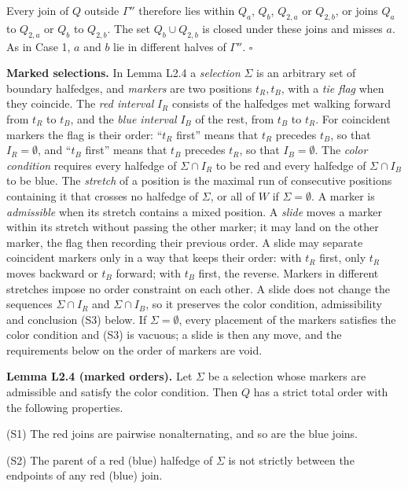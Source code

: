\documentclass[
  11pt,
]{article}
\begin{document}
Every join of \(Q\) outside \(\Gamma''\) therefore lies within \(Q_a\),
\(Q_b\), \(Q_{2,a}\) or \(Q_{2,b}\), or joins \(Q_a\) to \(Q_{2,a}\) or
\(Q_b\) to \(Q_{2,b}\). The set \(Q_b\cup Q_{2,b}\) is closed under
these joins and misses \(a\). As in Case 1, \(a\) and \(b\) lie in
different halves of \(\Gamma''\). \(\square\)

\textbf{Marked selections.} In Lemma L2.4 a \emph{selection} \(\Sigma\)
is an arbitrary set of boundary halfedges, and \emph{markers} are two
positions \(t_R,t_B\), with a \emph{tie flag} when they coincide. The
\emph{red interval} \(I_R\) consists of the halfedges met walking
forward from \(t_R\) to \(t_B\), and the \emph{blue interval} \(I_B\) of
the rest, from \(t_B\) to \(t_R\). For coincident markers the flag is
their order: ``\(t_R\) first'' means that \(t_R\) precedes \(t_B\), so
that \(I_R=\emptyset\), and ``\(t_B\) first'' means that \(t_B\)
precedes \(t_R\), so that \(I_B=\emptyset\). The \emph{color condition}
requires every halfedge of \(\Sigma\cap I_R\) to be red and every
halfedge of \(\Sigma\cap I_B\) to be blue. The \emph{stretch} of a
position is the maximal run of consecutive positions containing it that
crosses no halfedge of \(\Sigma\), or all of \(W\) if
\(\Sigma=\emptyset\). A marker is \emph{admissible} when its stretch
contains a mixed position. A \emph{slide} moves a marker within its
stretch without passing the other marker; it may land on the other
marker, the flag then recording their previous order. A slide may
separate coincident markers only in a way that keeps their order: with
\(t_R\) first, only \(t_R\) moves backward or \(t_B\) forward; with
\(t_B\) first, the reverse. Markers in different stretches impose no
order constraint on each other. A slide does not change the sequences
\(\Sigma\cap I_R\) and \(\Sigma\cap I_B\), so it preserves the color
condition, admissibility and conclusion (S3) below. If
\(\Sigma=\emptyset\), every placement of the markers satisfies the color
condition and (S3) is vacuous; a slide is then any move, and the
requirements below on the order of markers are void.

\textbf{Lemma L2.4 (marked orders).} Let \(\Sigma\) be a selection whose
markers are admissible and satisfy the color condition. Then \(Q\) has a
strict total order with the following properties.

(S1) The red joins are pairwise nonalternating, and so are the blue
joins.

(S2) The parent of a red (blue) halfedge of \(\Sigma\) is not strictly
between the endpoints of any red (blue) join.
\end{document}
